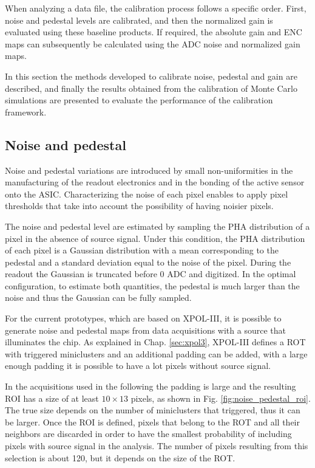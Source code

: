 When analyzing a data file, the calibration process follows a specific order. First, noise and pedestal levels are calibrated, and then the normalized gain is evaluated using these baseline products. If required, the absolute gain and ENC maps can subsequently be calculated using the ADC noise and normalized gain maps.

In this section the methods developed to calibrate noise, pedestal and gain are described, and finally the results obtained from the calibration of Monte Carlo simulations are presented to evaluate the performance of the calibration framework.

\subsection{Noise and pedestal}
\label{sec:noise_calibration}

Noise and pedestal variations are introduced by small non-uniformities in the manufacturing of the readout electronics and in the bonding of the active sensor onto the ASIC. Characterizing the noise of each pixel enables to apply pixel thresholds that take into account the possibility of having noisier pixels. 

The noise and pedestal level are estimated by sampling the PHA distribution of a pixel in the absence of source signal. Under this condition, the PHA distribution of each pixel is a Gaussian distribution with a mean corresponding to the pedestal and a standard deviation equal to the noise of the pixel. During the readout the Gaussian is truncated before 0 ADC and digitized. In the optimal configuration, to estimate both quantities, the pedestal is much larger than the noise and thus the Gaussian can be fully sampled. 

For the current prototypes, which are based on XPOL-III, it is possible to generate noise and pedestal maps from data acquisitions with a source that illuminates the chip.  As explained in Chap. \ref{sec:xpol3}, XPOL-III defines a ROT with triggered miniclusters and an additional padding can be added, with a large enough padding it is possible to have a lot pixels without source signal.

In the acquisitions used in the following the padding is large and the resulting ROI has a size of at least $10\times13$ pixels, as shown in Fig. \ref{fig:noise_pedestal_roi}. The true size depends on the number of miniclusters that triggered, thus it can be larger. Once the ROI is defined, pixels that belong to the ROT and all their neighbors are discarded in order to have the smallest probability of including pixels with source signal in the analysis. The number of pixels resulting from this selection is about 120, but it depends on the size of the ROT.

